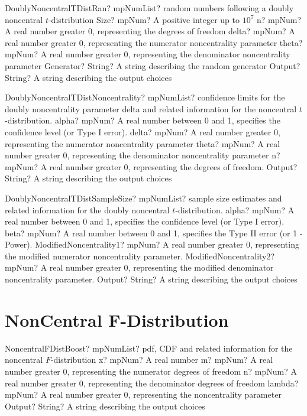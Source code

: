 \documentclass[12pt,a4paper,openany]{book}
\begin{document}
\begin{mpFunctionsExtract}
\mpFunctionSixNotImplemented
{DoublyNoncentralTDistRan? mpNumList? random numbers following a doubly noncentral $t$-distribution}
{Size? mpNum? A positive integer up to $10^7$}
{n? mpNum? A real number greater 0, representing the degrees of freedom}
{delta? mpNum? A real number greater 0, representing the numerator noncentrality parameter}
{theta? mpNum? A real number greater 0, representing the denominator noncentrality parameter}
{Generator? String? A string describing the random generator}
{Output? String? A string describing the output choices}
\end{mpFunctionsExtract}

\begin{mpFunctionsExtract}
\mpFunctionFiveNotImplemented
{DoublyNoncentralTDistNoncentrality? mpNumList? confidence limits for the doubly noncentrality parameter delta and related information for the noncentral $t$-distribution.}
{alpha? mpNum? A real number between 0 and 1, specifies the confidence level (or Type I error).}
{delta? mpNum? A real number greater 0, representing the numerator noncentrality parameter}
{theta? mpNum? A real number greater 0, representing the denominator noncentrality parameter}
{n? mpNum? A real number greater 0, representing the degrees of freedom.}
{Output? String? A string describing the output choices}
\end{mpFunctionsExtract}

\begin{mpFunctionsExtract}
\mpFunctionFiveNotImplemented
{DoublyNoncentralTDistSampleSize? mpNumList? sample size estimates and related information for the doubly noncentral $t$-distribution.}
{alpha? mpNum? A real number between 0 and 1, specifies the confidence level (or Type I error).}
{beta? mpNum?  A real number between 0 and 1, specifies the Type II error (or 1 - Power).}
{ModifiedNoncentrality1? mpNum? A real number greater 0, representing the modified numerator noncentrality parameter.}
{ModifiedNoncentrality2? mpNum? A real number greater 0, representing the modified denominator noncentrality parameter.}
{Output? String? A string describing the output choices}
\end{mpFunctionsExtract}

\section{NonCentral F-Distribution}

\begin{mpFunctionsExtract}
\mpFunctionFiveNotImplemented
{NoncentralFDistBoost? mpNumList? pdf, CDF and related information for the noncentral $F$-distribution}
{x? mpNum? A real number}
{m? mpNum? A real number greater 0, representing the numerator  degrees of freedom}
{n? mpNum? A real number greater 0, representing the denominator degrees of freedom}
{lambda? mpNum? A real number greater 0, representing the noncentrality parameter}
{Output? String? A string describing the output choices}
\end{mpFunctionsExtract}
\end{document}
